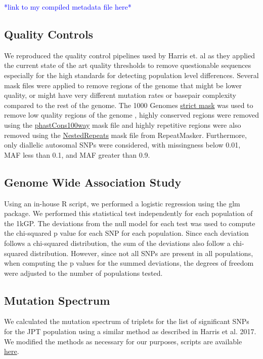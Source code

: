 \documentclass[9pt,lineno]{elife}
\newcommand{\todo}[1]{\textcolor{blue}{*#1*}}
\begin{document}
\todo{link to my compiled metadata file here}

\subsection{Quality Controls}
We reproduced the quality control pipelines used by Harris et. al as they applied the current state of the art quality thresholds to remove questionable sequences especially for the high standards for detecting population level differences. 
Several mask files were applied to remove regions of the genome that might be lower quality, or might have very different mutation rates or basepair complexity compared to the rest of the genome. 
The  1000 Genomes \href{http://ftp.1000genomes.ebi.ac.uk/vol1/ftp/release/20130502/supporting/accessible_genome_masks/20141020.strict_mask.whole_genome.bed}{strict mask} was used to remove low quality regions of the genome , highly conserved regions were removed using the \href{http://hgdownload.cse.ucsc.edu/goldenPath/hg19/database/phastConsElements100way.txt.gz}{phastCons100way} mask file and highly repetitive regions were also removed using the \href{http://hgdownload.cse.ucsc.edu/goldenpath/hg19/database/nestedRepeats.txt.gz}{NestedRepeats} mask file from RepeatMasker. 
Furthermore, only diallelic autosomal SNPs were considered, with missingness below 0.01, MAF less than 0.1, and MAF greater than 0.9.

\subsection{Genome Wide Association Study}
Using an in-house R script, we performed a logistic regression using the glm package. \cite{R,GLM} We performed this statistical test independently for each population of the 1kGP. The deviations from the null model for each test was used to compute the chi-squared p value for each SNP for each population. Since each deviation follows a chi-squared distribution, the sum of the deviations also follow a chi-squared distribution. However, since not all SNPs are present in all populations, when computing the p values for the summed deviations, the degrees of freedom were adjusted to the number of populations tested. 

\subsection{Mutation Spectrum}
We calculated the mutation spectrum of triplets for the list of significant SNPs for the JPT population using a similar method as described in Harris et al. 2017. \cite{Harris2017a}
We modified the methods as necessary for our purposes, scripts are available \href{https://github.com/LukeAndersonTrocme/QualityPaper}{here}. 
\end{document}
